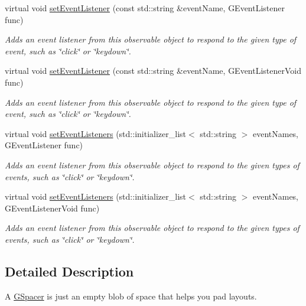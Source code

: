 \begin{DoxyCompactItemize}
virtual void \mbox{\hyperlink{classGObservable_ad2f6d34961c50f6c1e0659990b79f741}{set\+Event\+Listener}} (const std\+::string \&event\+Name, G\+Event\+Listener func)
\begin{DoxyCompactList}\small\item\em Adds an event listener from this observable object to respond to the given type of event, such as \char`\"{}click\char`\"{} or \char`\"{}keydown\char`\"{}. \end{DoxyCompactList}\item 
virtual void \mbox{\hyperlink{classGObservable_abac4cb9f9e626e010e87f5d91573c8a5}{set\+Event\+Listener}} (const std\+::string \&event\+Name, G\+Event\+Listener\+Void func)
\begin{DoxyCompactList}\small\item\em Adds an event listener from this observable object to respond to the given type of event, such as \char`\"{}click\char`\"{} or \char`\"{}keydown\char`\"{}. \end{DoxyCompactList}\item 
virtual void \mbox{\hyperlink{classGObservable_afa388d69c33c718cf035774604065604}{set\+Event\+Listeners}} (std\+::initializer\+\_\+list$<$ std\+::string $>$ event\+Names, G\+Event\+Listener func)
\begin{DoxyCompactList}\small\item\em Adds an event listener from this observable object to respond to the given types of events, such as \char`\"{}click\char`\"{} or \char`\"{}keydown\char`\"{}. \end{DoxyCompactList}\item 
virtual void \mbox{\hyperlink{classGObservable_a7867184bbb686f74fae8a4db927da799}{set\+Event\+Listeners}} (std\+::initializer\+\_\+list$<$ std\+::string $>$ event\+Names, G\+Event\+Listener\+Void func)
\begin{DoxyCompactList}\small\item\em Adds an event listener from this observable object to respond to the given types of events, such as \char`\"{}click\char`\"{} or \char`\"{}keydown\char`\"{}. \end{DoxyCompactList}\end{DoxyCompactItemize}


\subsection{Detailed Description}
A \mbox{\hyperlink{classGSpacer}{G\+Spacer}} is just an empty blob of space that helps you pad layouts. 

